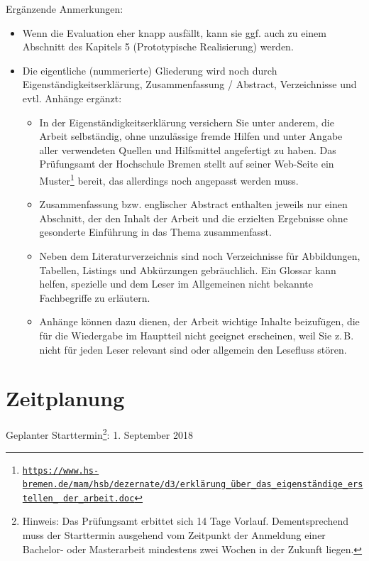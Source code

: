 \documentclass[11pt]{scrartcl}
\newcommand{\urlMitUmlauten}[2]{\texttt{\href{#1}{#2}}}				%
\newcommand{\zB}{\mbox{z.\,B.}\xspace}
\newcommand{\ggf}{ggf.\xspace}
\newcommand{\evtl}{evtl.\xspace}
\newcommand{\bzw}{bzw.\xspace}
\begin{document}
\pagebreak
\noindent
Ergänzende Anmerkungen:\nopagebreak
\begin{itemize}
	\item Wenn die Evaluation eher knapp ausfällt, kann sie \ggf auch zu einem Abschnitt des Kapitels 5 (Prototypische Realisierung) werden.
	\item Die eigentliche (nummerierte) Gliederung wird noch durch Eigenständigkeitserklärung, Zusammenfassung / Abstract, Verzeichnisse und \evtl Anhänge ergänzt:
	\begin{itemize}
		\item In der Eigenständigkeitserklärung versichern Sie unter anderem, die Arbeit selbständig, ohne unzulässige fremde Hilfen und unter Angabe aller verwendeten Quellen und Hilfsmittel angefertigt zu haben. 
		Das Prüfungsamt der Hochschule Bremen stellt auf seiner Web-Seite ein Muster\footnote{\urlMitUmlauten{https://www.hs-bremen.de/mam/hsb/dezernate/d3/erkl\%C3\%A4rung\_\%C3\%BCber\_das\_eigenst\%C3\%A4ndige\_erstellen\_der\_arbeit.doc}{https://www.hs-bremen.de/mam/hsb/dezernate/d3/erklärung\_über\_das\_eigenständige\_erstellen\_ der\_arbeit.doc}} bereit, das allerdings noch angepasst werden muss.
		\item Zusammenfassung \bzw englischer Abstract enthalten jeweils nur einen Abschnitt, der den Inhalt der Arbeit und die erzielten Ergebnisse ohne gesonderte Einführung in das Thema zusammenfasst.
		\item Neben dem Literaturverzeichnis sind noch Verzeichnisse für Abbildungen, Tabellen, Listings und Abkürzungen gebräuchlich. Ein Glossar kann helfen, spezielle und dem Leser im Allgemeinen nicht bekannte Fachbegriffe zu erläutern.
		\item Anhänge können dazu dienen, der Arbeit wichtige Inhalte beizufügen, die für die Wiedergabe im Hauptteil nicht geeignet erscheinen, weil Sie \zB nicht für jeden Leser relevant sind oder allgemein den Lesefluss stören.
	\end{itemize}
\end{itemize}


\section{Zeitplanung}

Geplanter Starttermin\footnote{Hinweis: Das Prüfungsamt erbittet sich 14 Tage Vorlauf. Dementsprechend muss der Starttermin ausgehend vom Zeitpunkt der Anmeldung einer Bachelor- oder Masterarbeit mindestens zwei Wochen in der Zukunft liegen.}: 
1. September 2018
\end{document}
